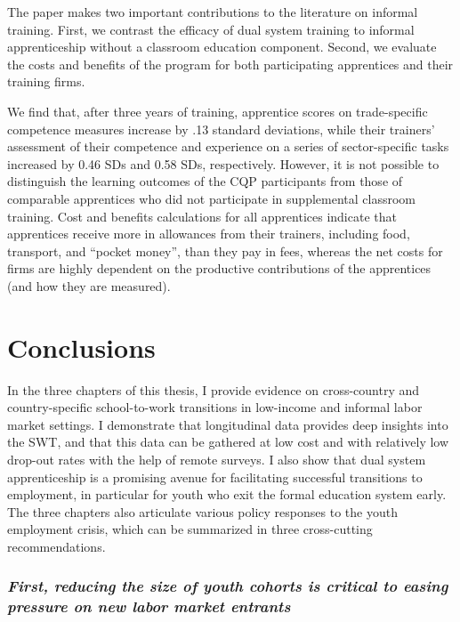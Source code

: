 \documentclass[
  a4paper, twoside, 12pt]{book}
\begin{document}
The paper makes two important contributions to the literature on informal training. First, we contrast the efficacy of dual system training to informal apprenticeship without a classroom education component. Second, we evaluate the costs and benefits of the program for both participating apprentices and their training firms.

We find that, after three years of training, apprentice scores on trade-specific competence measures increase by .13 standard deviations, while their trainers' assessment of their competence and experience on a series of sector-specific tasks increased by 0.46 SDs and 0.58 SDs, respectively. However, it is not possible to distinguish the learning outcomes of the CQP participants from those of comparable apprentices who did not participate in supplemental classroom training. Cost and benefits calculations for all apprentices indicate that apprentices receive more in allowances from their trainers, including food, transport, and ``pocket money'', than they pay in fees, whereas the net costs for firms are highly dependent on the productive contributions of the apprentices (and how they are measured).

\hypertarget{conclusions}{%
\section{Conclusions}\label{conclusions}}

In the three chapters of this thesis, I provide evidence on cross-country and country-specific school-to-work transitions in low-income and informal labor market settings. I demonstrate that longitudinal data provides deep insights into the SWT, and that this data can be gathered at low cost and with relatively low drop-out rates with the help of remote surveys. I also show that dual system apprenticeship is a promising avenue for facilitating successful transitions to employment, in particular for youth who exit the formal education system early. The three chapters also articulate various policy responses to the youth employment crisis, which can be summarized in three cross-cutting recommendations.

\hypertarget{first-reducing-the-size-of-youth-cohorts-is-critical-to-easing-pressure-on-new-labor-market-entrants}{%
\subsubsection*{\texorpdfstring{\emph{First, reducing the size of youth cohorts is critical to easing pressure on new labor market entrants}}{First, reducing the size of youth cohorts is critical to easing pressure on new labor market entrants}}\label{first-reducing-the-size-of-youth-cohorts-is-critical-to-easing-pressure-on-new-labor-market-entrants}}
\end{document}

